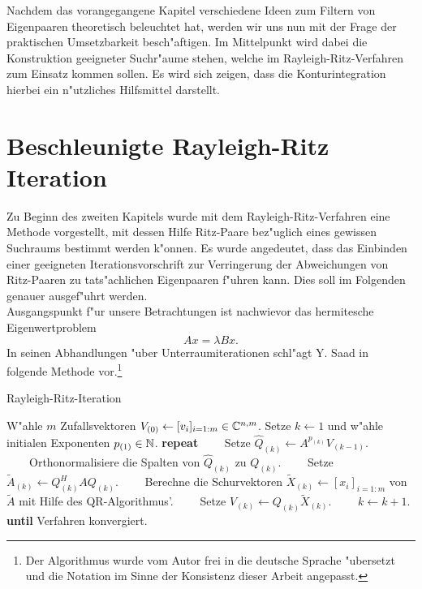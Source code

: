 Nachdem das vorangegangene Kapitel verschiedene Ideen zum Filtern von Eigenpaaren theoretisch beleuchtet hat, werden wir uns nun mit der Frage der praktischen Umsetzbarkeit besch"aftigen.
Im Mittelpunkt wird dabei die Konstruktion geeigneter Suchr"aume stehen, welche im Rayleigh-Ritz-Verfahren zum Einsatz kommen sollen.
Es wird sich zeigen, dass die Konturintegration hierbei ein n"utzliches Hilfsmittel darstellt.


\section{Beschleunigte Rayleigh-Ritz Iteration}\label{chap3:beschrr}

Zu Beginn des zweiten Kapitels wurde mit dem Rayleigh-Ritz-Verfahren eine Methode vorgestellt, mit dessen Hilfe Ritz-Paare bez"uglich eines gewissen Suchraums bestimmt werden k"onnen.
Es wurde angedeutet, dass das Einbinden einer geeigneten Iterationsvorschrift zur Verringerung der Abweichungen von Ritz-Paaren zu tats"achlichen Eigenpaaren f"uhren kann.
Dies soll im Folgenden genauer ausgef"uhrt werden.\\

\newpage
Ausgangspunkt f"ur unsere Betrachtungen ist nachwievor das hermitesche Eigenwertproblem
\begin{equation}\label{eq:chap3ewp}
Ax = \lambda Bx.
\end{equation}
In seinen Abhandlungen "uber Unterraumiterationen
schl"agt Y. Saad in ~\cite[118 f.]{saad} folgende Methode vor.\footnote{Der Algorithmus wurde vom Autor frei in die deutsche Sprache "ubersetzt und die Notation im Sinne der Konsistenz dieser Arbeit angepasst.}

\begin{algorithm}\label{alg:chap3rriter}
\caption{Rayleigh-Ritz-Iteration}\label{euclid}
\begin{algorithmic}[1]
\State W"ahle $m$ Zufallsvektoren $V_{(0)} \gets [v_i]_{i=1:m} \in\mathbb{C}^{n,m}$.
Setze $k \gets 1$ und w"ahle initialen Exponenten $p_{(1)} \in\mathbb{N}$.
\State \textbf{repeat}
\State \ \ \ \ Setze $\hat{Q}_{(k)} \gets A^{p_{(k)}} V_{(k-1)}$.
\State \ \ \ \ Orthonormalisiere die Spalten von $\hat{Q}_{(k)}$ zu $Q_{(k)}$.
\State \ \ \ \ Setze $\widetilde{A}_{(k)} \gets Q_{(k)}^H A Q_{(k)}$.
\State \ \ \ \ Berechne die Schurvektoren $\widetilde{X}_{(k)} \gets [x_i]_{i=1:m}$ von $\widetilde{A}$ mit Hilfe des QR-Algorithmus'.
\State \ \ \ \ Setze $V_{(k)} \gets Q_{(k)}\widetilde{X}_{(k)}$.
\State \ \ \ \ $k \gets k+1$.
\State \textbf{until} Verfahren konvergiert.
\end{algorithmic}
\end{algorithm}

